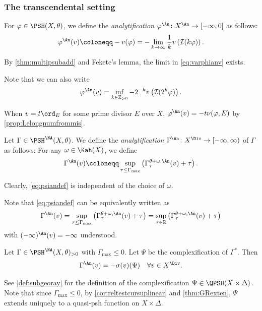 \subsubsection{The transcendental setting}
\label{subsubsec:analytic_trans}

\begin{definition}\label{def:NApotential:L975}
    For $\varphi\in \PSH(X,\theta)$, we define the \emph{analytification} $\varphi^{\An}\colon X^{\An}\rightarrow [-\infty,0]$ as follows:
\begin{equation}\label{eq:varphianv}
\varphi^{\An}(v)\coloneqq -v(\varphi)=-\lim_{k\to\infty}\frac{1}{k}v\left(\mathcal{I}(k\varphi) \right).
\end{equation}
\end{definition}
By \cref{thm:multipsubadd} and Fekete's lemma, the limit in \eqref{eq:varphianv} exists.

Note that we can also write
\begin{equation}\label{eq:varphiAnalt}
\varphi^{\An}(v)=\inf_{k\in \mathbb{Z}_{>0}} -2^{-k}v\left( \mathcal{I}(2^k\varphi)\right).
\end{equation}

When $v=t\ord_E$ for some prime divisor $E$ over $X$, $\varphi^{\An}(v)=-t\nu(\varphi,E)$ by \cref{prop:Lelongnumfrommis}.

\begin{definition}\label{def:Gammaana}
    Let $\Gamma\in \PSH^{\NA}(X,\theta)$. We define the \emph{analytification} $\Gamma^{\An}\colon X^{\Div}\rightarrow [-\infty,\infty)$ of $\Gamma$ as follows: For any $\omega\in \Kah(X)$, we define
    \begin{equation}\label{eq:psiandef}
        \Gamma^{\An}(v)\coloneqq \sup_{\tau\leq \Gamma_{\max}}\left(\Gamma_{\tau}^{\theta+\omega,\An}(v)+\tau\right).
    \end{equation}
\end{definition}
Clearly, \eqref{eq:psiandef} is independent of the choice of $\omega$.

Note that \eqref{eq:psiandef} can be equivalently written as
\[
\Gamma^{\An}(v)= \sup_{\tau\leq \Gamma_{\max}}\left(\Gamma_{\tau}^{\theta+\omega,\An}(v)+\tau\right)=\sup_{\tau\in \mathbb{R}}\left(\Gamma_{\tau}^{\theta+\omega,\An}(v)+\tau\right)
\]
with $(-\infty)^{\An}(v) = -\infty$ understood.

\begin{proposition}\label{prop:psiandPhi}
Let $\Gamma\in \PSH^{\NA}(X,\theta)_{>0}$ with $\Gamma_{\max}\leq 0$. Let $\Psi$ be the complexification of $\Gamma^*$. Then
\begin{equation}\label{eq:psiansigma}
\Gamma^{\An}(v)=-\sigma(v)(\Psi)\quad \forall v\in X^{\Div}.
\end{equation}
\end{proposition}
See \cref{def:subgeoray} for the definition of the complexification $\Psi\in \QPSH(X\times \Delta)$. Note that since $\Gamma_{\max}\leq 0$, by \cref{cor:reltestcursuplinear} and \cref{thm:GRexten}, $\Psi$ extends uniquely to a quasi-psh function on $X\times \Delta$.

